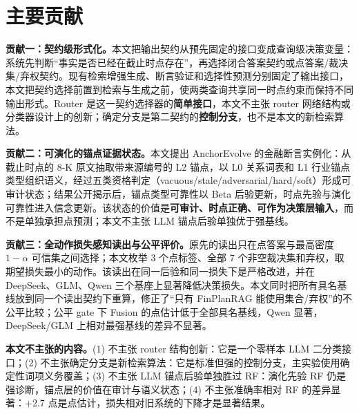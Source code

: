 \section{主要贡献}

\begin{revbox}
\noindent\textbf{贡献一：契约级形式化。}本文把输出契约从预先固定的接口变成查询级决策变量：系统先判断“事实是否已经在截止时点存在”，再选择闭合答案契约或点答案/裁决集/弃权契约。现有检索增强生成、断言验证和选择性预测分别固定了输出接口，本文把契约选择前置到检索与生成之前，使两类查询共享同一时点约束而保持不同输出形式。Router 是这一契约选择器的\textbf{简单接口}，本文不主张 router 网络结构或分类器设计上的创新；确定分支是第二契约的\textbf{控制分支}，也不是本文的新检索算法。
\end{revbox}

\begin{revbox}
\noindent\textbf{贡献二：可演化的锚点证据状态。}本文提出 AnchorEvolve 的金融断言实例化：从截止时点的 8-K 原文抽取带来源编号的 L2 锚点，以 L0 关系词表和 L1 行业锚点类型组织语义，经过五类资格判定（vacuous/stale/adversarial/hard/soft）形成可审计状态；结果公开揭示后，锚点类型可靠性以 Beta 后验更新，时点先验与演化可靠性进入信念更新。该状态的价值是\textbf{可审计、时点正确、可作为决策层输入}，而不是单独承担点预测；本文不主张 LLM 锚点后验单独优于强基线。
\end{revbox}

\begin{revbox}
\noindent\textbf{贡献三：全动作损失感知读出与公平评价。}原先的读出只在点答案与最高密度 $1-\alpha$ 可信集之间选择；本文枚举 3 个点标签、全部 7 个非空裁决集和弃权，取期望损失最小的动作。该读出在同一后验和同一损失下是严格改进，并在 DeepSeek、GLM、Qwen 三个基座上显著降低决策损失。本文同时把所有具名基线放到同一个读出契约下重算，修正了“只有 FinPlanRAG 能使用集合/弃权”的不公平比较；公平 gate 下 Fusion 的点估计低于全部具名基线，Qwen 显著，DeepSeek/GLM 上相对最强基线的差异不显著。
\end{revbox}

\begin{revbox}
\noindent\textbf{本文不主张的内容。}(1) 不主张 router 结构创新：它是一个零样本 LLM 二分类接口；(2) 不主张确定分支是新检索算法：它是标准但强的控制分支，主实验使用确定性词项义务覆盖；(3) 不主张 LLM 锚点后验单独胜过 RF：演化先验 RF 仍是强诊断，锚点层的价值在审计与语义状态；(4) 不主张准确率相对 RF 的差异显著：+2.7 点是点估计，损失相对旧系统的下降才是显著结果。
\end{revbox}

